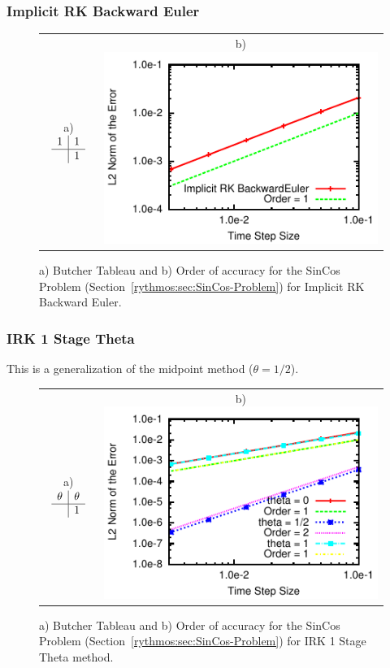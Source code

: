 \subsubsection{Implicit RK Backward Euler}

\begin{figure}[H]
\centering{}%
\begin{tabular}{cc}
a) $\begin{array}{c|c}
1 & 1\\
\hline  & 1
\end{array}$ & b)\includegraphics[scale=1.5]{figures/IRK_BackwardEuler}\tabularnewline
\end{tabular}\caption{a) Butcher Tableau and b) Order of accuracy for the SinCos Problem
(Section~\ref{rythmos:sec:SinCos-Problem}) for Implicit RK Backward
Euler.}
\end{figure}



\subsubsection{IRK 1 Stage Theta}

This is a generalization of the midpoint method ($\theta=1/2$).

\begin{figure}[H]
\centering{}%
\begin{tabular}{cc}
a) $\begin{array}{c|c}
\theta & \theta\\
\hline  & 1
\end{array}$ & b)\includegraphics[scale=1.5]{figures/IRK1StageTheta1}\tabularnewline
\end{tabular}\caption{a) Butcher Tableau and b) Order of accuracy for the SinCos Problem
(Section~\ref{rythmos:sec:SinCos-Problem}) for IRK 1 Stage Theta
method.}
\end{figure}



